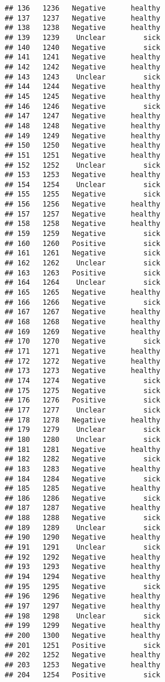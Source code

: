 \documentclass[
]{article}
\begin{document}
\begin{verbatim}
## 136   1236   Negative      healthy
## 137   1237   Negative      healthy
## 138   1238   Negative      healthy
## 139   1239    Unclear         sick
## 140   1240   Negative         sick
## 141   1241   Negative      healthy
## 142   1242   Negative      healthy
## 143   1243    Unclear         sick
## 144   1244   Negative      healthy
## 145   1245   Negative      healthy
## 146   1246   Negative         sick
## 147   1247   Negative      healthy
## 148   1248   Negative      healthy
## 149   1249   Negative      healthy
## 150   1250   Negative      healthy
## 151   1251   Negative      healthy
## 152   1252    Unclear         sick
## 153   1253   Negative      healthy
## 154   1254    Unclear         sick
## 155   1255   Negative         sick
## 156   1256   Negative      healthy
## 157   1257   Negative      healthy
## 158   1258   Negative      healthy
## 159   1259   Negative         sick
## 160   1260   Positive         sick
## 161   1261   Negative         sick
## 162   1262    Unclear         sick
## 163   1263   Positive         sick
## 164   1264    Unclear         sick
## 165   1265   Negative      healthy
## 166   1266   Negative         sick
## 167   1267   Negative      healthy
## 168   1268   Negative      healthy
## 169   1269   Negative      healthy
## 170   1270   Negative         sick
## 171   1271   Negative      healthy
## 172   1272   Negative      healthy
## 173   1273   Negative      healthy
## 174   1274   Negative         sick
## 175   1275   Negative         sick
## 176   1276   Positive         sick
## 177   1277    Unclear         sick
## 178   1278   Negative      healthy
## 179   1279    Unclear         sick
## 180   1280    Unclear         sick
## 181   1281   Negative      healthy
## 182   1282   Negative         sick
## 183   1283   Negative      healthy
## 184   1284   Negative         sick
## 185   1285   Negative      healthy
## 186   1286   Negative         sick
## 187   1287   Negative      healthy
## 188   1288   Negative         sick
## 189   1289    Unclear         sick
## 190   1290   Negative      healthy
## 191   1291    Unclear         sick
## 192   1292   Negative      healthy
## 193   1293   Negative      healthy
## 194   1294   Negative      healthy
## 195   1295   Negative         sick
## 196   1296   Negative      healthy
## 197   1297   Negative      healthy
## 198   1298    Unclear         sick
## 199   1299   Negative      healthy
## 200   1300   Negative      healthy
## 201   1251   Positive         sick
## 202   1252   Negative      healthy
## 203   1253   Negative      healthy
## 204   1254   Positive         sick

\end{verbatim}
\end{document}
